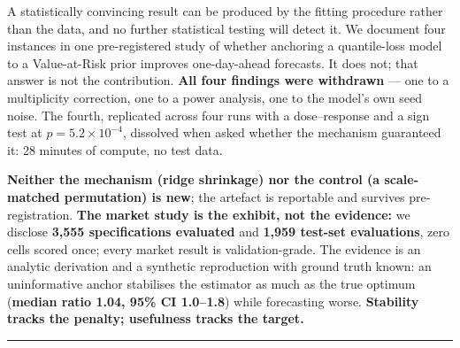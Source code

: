 A statistically convincing result can be produced by the fitting procedure rather than the
data, and no further statistical testing will detect it. We document four instances in one
pre-registered study of whether anchoring a quantile-loss model to a Value-at-Risk
prior improves one-day-ahead forecasts. It does not; that answer is not the contribution.
\textbf{All four findings were withdrawn} --- one to a multiplicity correction, one to a power
analysis, one to the model's own seed noise. The fourth, replicated across four runs with a
dose--response and a sign test at \(p = 5.2 \times 10^{-4}\), dissolved when asked whether the
mechanism guaranteed it: 28 minutes of compute, no test data.

\textbf{Neither the mechanism (ridge shrinkage) nor the control (a scale-matched permutation) is
new}; the artefact is reportable and survives pre-registration. \textbf{The market
study is the exhibit, not the evidence:} we disclose \textbf{3,555 specifications evaluated} and
\textbf{1,959 test-set evaluations}, zero cells scored once; every market result is
validation-grade. The evidence is an analytic derivation and a synthetic reproduction with
ground truth known: an uninformative anchor stabilises the estimator as much as the true
optimum (\textbf{median ratio 1.04, 95\% CI 1.0--1.8}) while forecasting worse. \textbf{Stability tracks the
penalty; usefulness tracks the target.}

\begin{center}\rule{0.5\linewidth}{0.5pt}\end{center}
